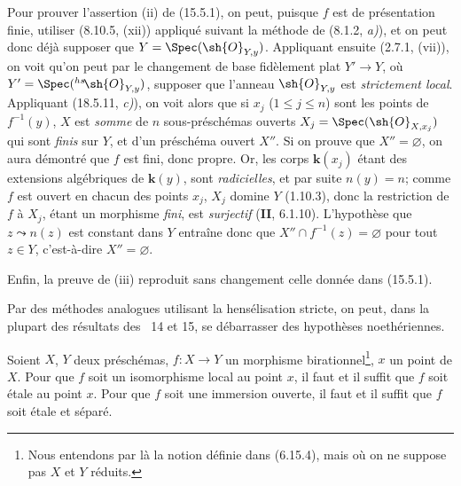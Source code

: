 Pour prouver l'assertion (ii) de (15.5.1), on peut, puisque $f$ est de présentation finie, utiliser (8.10.5, (xii)) appliqué suivant la méthode de (8.1.2, \emph{a)}), et on peut donc déjà supposer que $Y=\Spec(\sh{O}_{Y,y})$. Appliquant ensuite (2.7.1, (vii)), on voit qu'on peut par le changement de base fidèlement plat $Y'\to Y$, où $Y'=\Spec({}^{hs}\!\sh{O}_{Y,y})$, supposer que l'anneau $\sh{O}_{Y,y}$ est \emph{strictement local}. Appliquant (18.5.11, \emph{c)}), on voit alors que si $x_j$ ($1\leq j\leq n$) sont les points de $f^{-1}(y)$, $X$ est \emph{somme} de $n$ sous-préschémas ouverts $X_j=\Spec(\sh{O}_{X,x_j})$ qui sont \emph{finis} sur $Y$, et d'un préschéma ouvert $X''$. Si on prouve que $X''=\varnothing$, on aura démontré que $f$ est fini, donc propre. Or, les corps $\boldsymbol{k}(x_j)$ étant des extensions algébriques de $\boldsymbol{k}(y)$, sont \emph{radicielles}, et par suite $n(y)=n$; comme $f$ est ouvert en chacun des points $x_j$, $X_j$ domine $Y$ (1.10.3), donc la restriction de $f$ à $X_j$, étant un morphisme \emph{fini}, est \emph{surjectif} (\textbf{II}, 6.1.10). L'hypothèse que $z\leadsto n(z)$ est constant dans $Y$ entraîne donc que $X''\cap f^{-1}(z)=\varnothing$ pour tout $z\in Y$, c'est-à-dire $X''=\varnothing$.

Enfin, la preuve de (iii) reproduit sans changement celle donnée dans (15.5.1).

\begin{env}[18.10.17.2]
\label{IV.18.10.17.2}
Par des méthodes analogues utilisant la hensélisation stricte, on peut, dans la plupart des résultats des \textsection\textsection~14 et 15, se débarrasser des hypothèses noethériennes.
\end{env}

\begin{lemma}[18.10.18]
\label{IV.18.10.18}
Soient $X$, $Y$ deux préschémas, $f:X\to Y$ un morphisme birationnel\footnote{Nous entendons par là la notion définie dans (6.15.4), mais où on ne suppose pas $X$ et $Y$ réduits.}, $x$ un point de $X$. Pour que $f$ soit un isomorphisme local au point $x$, il faut et il suffit que $f$ soit étale au point $x$. Pour que $f$ soit une immersion ouverte, il faut et il suffit que $f$ soit étale et séparé.
\end{lemma}

